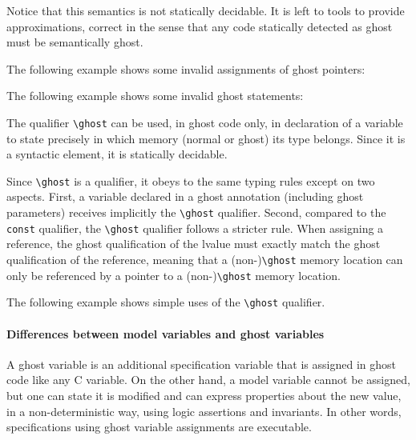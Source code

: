 Notice that this semantics is not statically decidable.
It is left to tools to provide approximations,
correct in the sense that any code
statically detected as ghost must be semantically ghost.

\begin{example}
  The following example shows some invalid assignments of ghost pointers:
\end{example}

\begin{example}
  The following example shows some invalid ghost statements:
\end{example}

The qualifier \lstinline|\ghost| can be used, in ghost code only, in declaration
of a variable to state precisely in which memory (normal or ghost) its type
belongs. Since it is a syntactic element, it is statically decidable.

Since \lstinline|\ghost| is a qualifier, it obeys to the same typing rules except
on two aspects. First, a variable declared in a ghost annotation (including
ghost parameters) receives implicitly the \lstinline|\ghost| qualifier. Second,
compared to the \lstinline|const| qualifier, the \lstinline|\ghost| qualifier
follows a stricter rule. When assigning a reference, the ghost qualification of
the lvalue must exactly match the ghost qualification of the reference, meaning
that a (non-)\lstinline|\ghost| memory location can only be referenced
by a pointer to a (non-)\lstinline|\ghost| memory location.

\begin{example}
  The following example shows simple uses of the \lstinline|\ghost| qualifier.
\end{example}

\paragraph{Differences between model variables and ghost variables}

A ghost variable is an additional specification variable that is
assigned in ghost code like any C variable. On the other hand, a model
variable cannot be assigned, but one can state it is modified and can
express properties about the new value, in a non-deterministic way,
using logic assertions and invariants.
In other words, specifications using ghost variable assignments
are executable.

